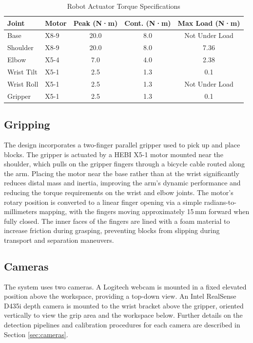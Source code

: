 \begin{table}[!h]
\centering
\caption{Robot Actuator Torque Specifications}
\label{table:motors}
\begin{tabular}{|l|l|c|c|c|}
\hline
\textbf{Joint} & \textbf{Motor} & \textbf{Peak (N·m)} & \textbf{Cont. (N·m)} & \textbf{Max Load (N·m)} \\ \hline
Base & X8-9 & 20.0 & 8.0 & Not Under Load \\ \hline
Shoulder & X8-9 & 20.0 & 8.0 & 7.36 \\ \hline
Elbow & X5-4 & 7.0 & 4.0 & 2.38 \\ \hline
Wrist Tilt & X5-1 & 2.5 & 1.3 & 0.1 \\ \hline
Wrist Roll & X5-1 & 2.5 & 1.3 & Not Under Load \\ \hline
Gripper & X5-1 & 2.5 & 1.3 & 0.1 \\ \hline
\end{tabular}
\end{table}

\subsection{Gripping}
The design incorporates a two-finger parallel gripper used to pick up and place blocks. The gripper is actuated by a HEBI X5-1 motor mounted near the shoulder, which pulls on the gripper fingers through a bicycle cable routed along the arm. Placing the motor near the base rather than at the wrist significantly reduces distal mass and inertia, improving the arm's dynamic performance and reducing the torque requirements on the wrist and elbow joints. The motor's rotary position is converted to a linear finger opening via a simple radians-to-millimeters mapping, with the fingers moving approximately 15\,mm forward when fully closed. The inner faces of the fingers are lined with a foam material to increase friction during grasping, preventing blocks from slipping during transport and separation maneuvers.

\subsection{Cameras}
The system uses two cameras. A Logitech webcam is mounted in a fixed elevated position above the workspace, providing a top-down view. An Intel RealSense D435i depth camera is mounted to the wrist bracket above the gripper, oriented vertically to view the grip area and the workspace below. Further details on the detection pipelines and calibration procedures for each camera are described in Section \ref{sec:cameras}.